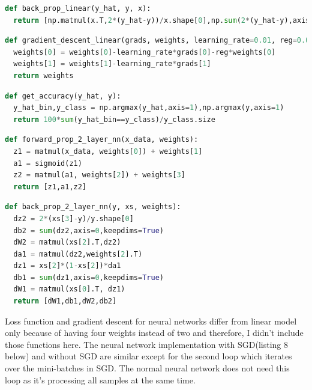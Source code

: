 \documentclass[10pt, a4paper, twocolumn]{article}
\begin{document}
\begin{lstlisting}[frame=single,language=python,caption=Backward propagation function for linear classifier]
def back_prop_linear(y_hat, y, x):
  return [np.matmul(x.T,2*(y_hat-y))/x.shape[0],np.sum(2*(y_hat-y),axis=0)/x.shape[0]]
\end{lstlisting}

\begin{lstlisting}[frame=single,language=python,caption=Gradient descent function for linear classifier]
def gradient_descent_linear(grads, weights, learning_rate=0.01, reg=0.0):
  weights[0] = weights[0]-learning_rate*grads[0]-reg*weights[0]
  weights[1] = weights[1]-learning_rate*grads[1]
  return weights
\end{lstlisting}

\begin{lstlisting}[frame=single,language=python,caption=Top-one accuracy function]
def get_accuracy(y_hat, y):
  y_hat_bin,y_class = np.argmax(y_hat,axis=1),np.argmax(y,axis=1)
  return 100*sum(y_hat_bin==y_class)/y_class.size
\end{lstlisting}

\begin{lstlisting}[frame=single,language=python,caption=Forward propagation function for neural networks]
def forward_prop_2_layer_nn(x_data, weights):
  z1 = matmul(x_data, weights[0]) + weights[1]
  a1 = sigmoid(z1)
  z2 = matmul(a1, weights[2]) + weights[3]
  return [z1,a1,z2]
\end{lstlisting}

\begin{lstlisting}[frame=single,language=python,caption=Backward propagation function for neural networks]
def back_prop_2_layer_nn(y, xs, weights):
  dz2 = 2*(xs[3]-y)/y.shape[0]
  db2 = sum(dz2,axis=0,keepdims=True)
  dW2 = matmul(xs[2].T,dz2)
  da1 = matmul(dz2,weights[2].T)
  dz1 = xs[2]*(1-xs[2])*da1
  db1 = sum(dz1,axis=0,keepdims=True)
  dW1 = matmul(xs[0].T, dz1)
  return [dW1,db1,dW2,db2]
\end{lstlisting}

Loss function and gradient descent for neural networks differ from linear model only because of having four weights instead of two and therefore, I didn't include those functions here. The neural network implementation with SGD(listing 8 below) and without SGD are similar except for the second loop which iterates over the mini-batches in SGD. The normal neural network does not need this loop as it's processing all samples at the same time.
\end{document}
